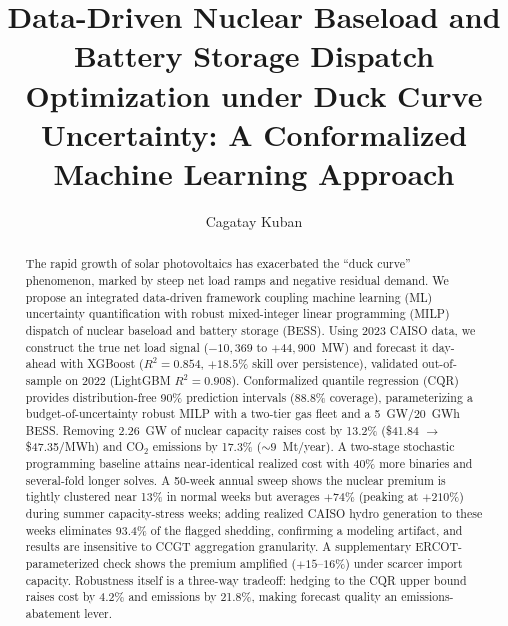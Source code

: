 \documentclass[preprint,12pt,authoryear]{elsarticle}
\begin{document}
\begin{frontmatter}

\title{Data-Driven Nuclear Baseload and Battery Storage Dispatch Optimization under Duck Curve Uncertainty: A Conformalized Machine Learning Approach}


\author[inst1]{Cagatay Kuban}


\begin{abstract}
The rapid growth of solar photovoltaics has exacerbated the ``duck curve'' phenomenon, marked by steep net load ramps and negative residual demand. We propose an integrated data-driven framework coupling machine learning (ML) uncertainty quantification with robust mixed-integer linear programming (MILP) dispatch of nuclear baseload and battery storage (BESS). Using 2023 CAISO data, we construct the true net load signal ($-10{,}369$ to $+44{,}900$~MW) and forecast it day-ahead with XGBoost ($R^2 = 0.854$, $+18.5\%$ skill over persistence), validated out-of-sample on 2022 (LightGBM $R^2 = 0.908$). Conformalized quantile regression (CQR) provides distribution-free 90\% prediction intervals (88.8\% coverage), parameterizing a budget-of-uncertainty robust MILP with a two-tier gas fleet and a 5~GW/20~GWh BESS. Removing 2.26~GW of nuclear capacity raises cost by 13.2\% (\$41.84 $\to$ \$47.35/MWh) and CO$_2$ emissions by 17.3\% (${\sim}9$~Mt/year). A two-stage stochastic programming baseline attains near-identical realized cost with 40\% more binaries and several-fold longer solves. A 50-week annual sweep shows the nuclear premium is tightly clustered near 13\% in normal weeks but averages $+74\%$ (peaking at $+210\%$) during summer capacity-stress weeks; adding realized CAISO hydro generation to these weeks eliminates 93.4\% of the flagged shedding, confirming a modeling artifact, and results are insensitive to CCGT aggregation granularity. A supplementary ERCOT-parameterized check shows the premium amplified ($+15$--$16\%$) under scarcer import capacity. Robustness itself is a three-way tradeoff: hedging to the CQR upper bound raises cost by 4.2\% and emissions by 21.8\%, making forecast quality an emissions-abatement lever.
\end{abstract}


\end{frontmatter}
\end{document}

